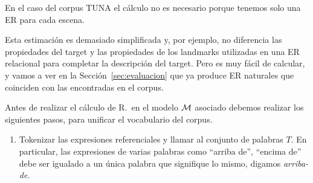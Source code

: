 En el caso del corpus TUNA el c\'alculo no es necesario
porque tenemos solo una ER para cada escena.

Esta estimaci\'on es demasiado simplificada y, por ejemplo, no 
diferencia las propiedades del target y las propiedades de
los landmarks utilizadas en una ER relacional para completar la descripci\'on
del target. Pero es muy f\'acil de calcular, y vamos a ver
en la Secci\'on~\ref{sec:evaluacion} que ya produce ER naturales
que coinciden con las encontradas en el corpus.


Antes de realizar el c\'alculo de R.\puse \ en el modelo $\mathcal{M}$ asociado debemos realizar los siguientes pasos, para unificar el vocabulario del corpus.


\begin{enumerate}





\item Tokenizar las expresiones referenciales y llamar al conjunto de palabras
 $T$. En particular, las expresiones de varias palabras como ``arriba de'', ``encima de''
  debe ser igualado a un \'unica palabra que signifique lo mismo, digamos \emph{arriba-de}.


\end{enumerate}

